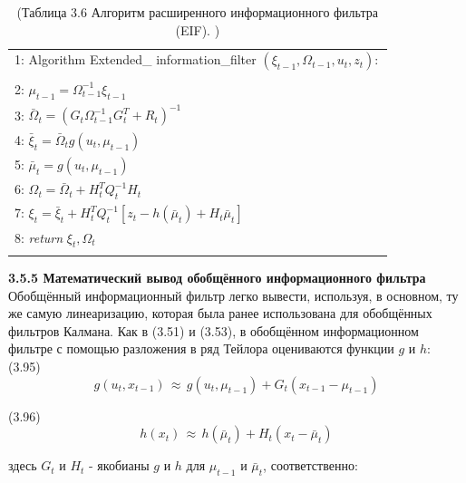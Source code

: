 \documentclass[10pt,a4paper]{article}
\begin{document}
\begin{table}[H]
\begin{center}
\begin{tabular}{|l|}
\hline
1: \hspace{3mm} Algorithm Extended\_ information\_filter $(\xi_{t-1},\varOmega_{t-1},u_t,z_t):$ \\
{}\\
2: \hspace{7mm} 
$\mu_{t-1}=\varOmega_{t-1}^{-1}\xi_{t-1}$\\
3: \hspace{7mm} $\bar{\varOmega}_t=(G_t\varOmega_{t-1}^{-1}G_t^T+R_t)^{-1}$\\
4: \hspace{7mm} $\bar{\xi}_t=\bar{\varOmega}_t g(u_t,\mu_{t-1})$\\
5: \hspace{7mm} $\bar{\mu}_t=g(u_t,\mu_{t-1})$\\
6: \hspace{7mm} $\varOmega_t=\bar{\varOmega}_t+H_t^T Q_t^{-1}H_t$\\
7: \hspace{7mm} $\xi_t=\bar{\xi}_t+H_t^T Q_t^{-1}[z_t-h(\bar{\mu}_t)+H_t\bar{\mu}_t]$\\
8: \hspace{7mm}
\textit{return} $\xi_t,\varOmega_t$\\
{}\\
\hline
\end{tabular}
\caption{(Таблица 3.6 Алгоритм расширенного информационного фильтра (EIF). )}
\end{center}
\end{table}

\textbf{3.5.5 Математический вывод обобщённого информационного фильтра}\\

Обобщённый информационный фильтр легко вывести, используя, в основном, ту же самую линеаризацию, которая была ранее использована для обобщённых фильтров Калмана. Как в (3.51) и (3.53), в обобщённом информационном фильтре с помощью разложения в ряд Тейлора оцениваются функции $g$ и $h$:\\

(3.95)
$$g(u_t,x_{t-1})\,\approx\,g(u_t,\mu_{t-1})+G_t(x_{t-1}-\mu_{t-1})$$

(3.96)
$$h(x_t)\,\approx\,h(\bar{\mu}_t)+H_t(x_t-\bar{\mu}_t)$$

здесь $G_t$ и $H_t$ - якобианы $g$ и $h$ для $\mu_{t-1}$ и $\bar{\mu}_t$, соответственно:\\
\end{document}
